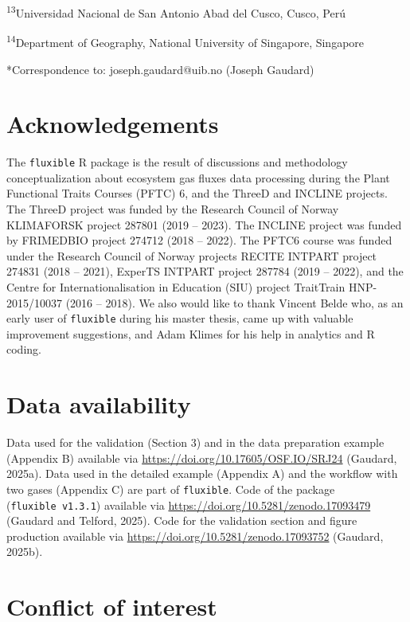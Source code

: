 \documentclass[
  letterpaper,
  DIV=11,
  numbers=noendperiod]{scrartcl}
\begin{document}
\textsuperscript{13}Universidad Nacional de San Antonio Abad del Cusco,
Cusco, Perú

\textsuperscript{14}Department of Geography, National University of
Singapore, Singapore

*Correspondence to: joseph.gaudard@uib.no (Joseph Gaudard)

\section*{Acknowledgements}\label{acknowledgements}

The \texttt{fluxible} R package is the result of discussions and
methodology conceptualization about ecosystem gas fluxes data processing
during the Plant Functional Traits Courses (PFTC) 6, and the ThreeD and
INCLINE projects. The ThreeD project was funded by the Research Council
of Norway KLIMAFORSK project 287801 (2019 -- 2023). The INCLINE project
was funded by FRIMEDBIO project 274712 (2018 -- 2022). The PFTC6 course
was funded under the Research Council of Norway projects RECITE INTPART
project 274831 (2018 -- 2021), ExperTS INTPART project 287784 (2019 --
2022), and the Centre for Internationalisation in Education (SIU)
project TraitTrain HNP-2015/10037 (2016 -- 2018). We also would like to
thank Vincent Belde who, as an early user of \texttt{fluxible} during
his master thesis, came up with valuable improvement suggestions, and
Adam Klimes for his help in analytics and R coding.

\section*{Data availability}\label{data-availability}

Data used for the validation (Section 3) and in the data preparation
example (Appendix B) available via
\url{https://doi.org/10.17605/OSF.IO/SRJ24} (Gaudard, 2025a). Data used
in the detailed example (Appendix A) and the workflow with two gases
(Appendix C) are part of \texttt{fluxible}. Code of the package
(\texttt{fluxible\ v1.3.1}) available via
\url{https://doi.org/10.5281/zenodo.17093479} (Gaudard and Telford,
2025). Code for the validation section and figure production available
via \url{https://doi.org/10.5281/zenodo.17093752} (Gaudard, 2025b).

\section*{Conflict of interest}\label{conflict-of-interest}
\end{document}
